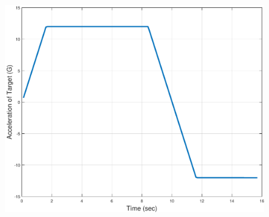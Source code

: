\documentclass{beamer}
\begin{document}
\begin{frame}
\begin{columns}[c]
	\begin{column}{.3\linewidth}
		\begin{figure}
			\centering
			\includegraphics[scale = 0.18]{fig/TargetAccelerationTrapSym.pdf}
		\end{figure}
	\end{column}
	
	
\end{columns}

\end{frame}

\end{document}
